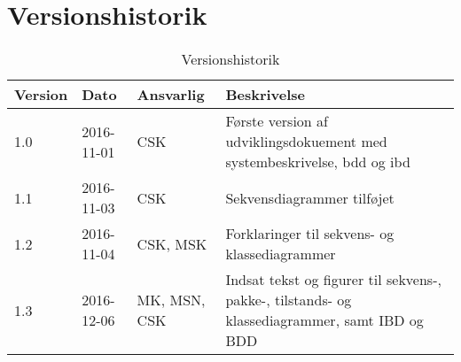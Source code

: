 \chapter{Versionshistorik}\label{Versionshistorik}

\begin{table}[htb]
\begin{tabular}{ | l | l | l | p{} | }
\hline
\textbf{Version} & \textbf{Dato} & \textbf{Ansvarlig} & \textbf{Beskrivelse} \\\hline
1.0 & 2016-11-01 & CSK & Første version af udviklingsdokuement med systembeskrivelse, bdd og ibd\\\hline
1.1 & 2016-11-03 & CSK & Sekvensdiagrammer tilføjet  \\\hline
1.2 & 2016-11-04 & CSK, MSK & Forklaringer til sekvens- og klassediagrammer \\\hline
1.3 & 2016-12-06 & MK, MSN, CSK & Indsat tekst og figurer til sekvens-, pakke-, tilstands- og klassediagrammer, samt IBD og BDD \\\hline
\end{tabular}
\caption{Versionshistorik}
\end{table}